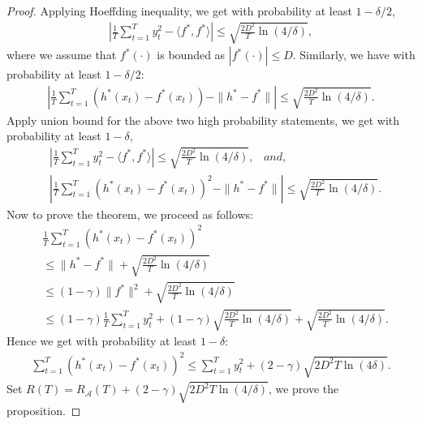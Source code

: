\begin{proof}
Applying Hoeffding inequality, we get with probability at least $1-\delta/2$,
\begin{align}
\label{eq:high_prob_1}
|\frac{1}{T}\sum_{t=1}^T y_t^2 - \langle f^*, f^*\rangle| \leq \sqrt{\frac{2D^2}{T}\ln(4/\delta)},
\end{align} where we assume that $f^*(\cdot)$ is bounded as $|f^*(\cdot)|\leq D$. Similarly, we have with probability at least $1-\delta/2$:
\begin{align}
|\frac{1}{T}\sum_{t=1}^T (h^*(x_t) - f^*(x_t)) - \|h^* - f^* \|| \leq \sqrt{\frac{2D^2}{T}\ln(4/\delta)}. 
\end{align} Apply union bound for the above two high probability statements, we get with probability at least $1-\delta$,
\begin{align}
&|\frac{1}{T}\sum_{t=1}^T y_t^2 - \langle f^*, f^*\rangle| \leq \sqrt{\frac{2D^2}{T}\ln(4/\delta)}, \;\;\; and,\nonumber\\
&|\frac{1}{T}\sum_{t=1}^T (h^*(x_t) - f^*(x_t))^2 - \|h^* - f^* \|| \leq \sqrt{\frac{2D^2}{T}\ln(4/\delta)}. 
\end{align} Now to prove the theorem, we proceed as follows:
\begin{align}
&\frac{1}{T}\sum_{t=1}^T (h^*(x_t) - f^*(x_t))^2 \nonumber\\
&\leq  \|h^* - f^* \| + \sqrt{\frac{2D^2}{T}\ln(4/\delta)}\nonumber\\
&\leq (1-\gamma)\|f^*\|^2+\sqrt{\frac{2D^2}{T}\ln(4/\delta)}\nonumber\\
&\leq (1-\gamma)\frac{1}{T}\sum_{t=1}^T y_t^2 + (1-\gamma)\sqrt{\frac{2D^2}{T}\ln(4/\delta)} + \sqrt{\frac{2D^2}{T}\ln(4/\delta)}.
\end{align} Hence we get with probability at least $1-\delta$:
\begin{align}
\sum_{t=1}^T (h^*(x_t) - f^*(x_t))^2 \leq \sum_{t=1}^T y_t^2 + (2-\gamma)\sqrt{2D^2 T\ln(4\delta)}.
\end{align} Set $R(T) = R_{\mathcal{A}}(T) + (2-\gamma)\sqrt{2D^2 T\ln(4/\delta)}$, we prove the proposition. 
\end{proof}

